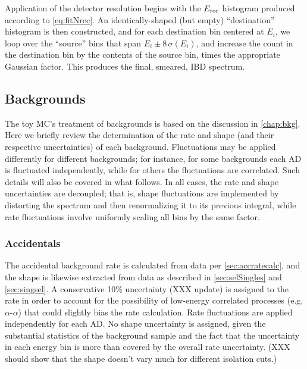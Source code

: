 \documentclass[../thesis.tex]{subfiles}
\begin{document}
Application of the detector resolution begins with the $E_\mathrm{rec}$ histogram produced according to \autoref{eq:fitNrec}. An identically-shaped (but empty) ``destination'' histogram is then constructed, and for each destination bin centered at $E_i$, we loop over the ``source'' bins that span $E_i \pm 8\,\sigma(E_i)$, and increase the count in the destination bin by the contents of the source bin, times the appropriate Gaussian factor. This produces the final, smeared, IBD spectrum.

\subsection{Backgrounds}
\label{sec:fitToyBackgrounds}

The toy MC's treatment of backgrounds is based on the discussion in \autoref{chap:bkg}. Here we briefly review the determination of the rate and shape (and their respective uncertainties) of each background. Fluctuations may be applied differently for different backgrounds; for instance, for some backgrounds each AD is fluctuated independently, while for others the fluctuations are correlated. Such details will also be covered in what follows. In all cases, the rate and shape uncertainties are decoupled; that is, shape fluctuations are implemented by distorting the spectrum and then renormalizing it to its previous integral, while rate fluctuations involve uniformly scaling all bins by the same factor.

\subsubsection{Accidentals}

The accidental background rate is calculated from data per \autoref{sec:accratecalc}, and the shape is likewise extracted from data as described in \autoref{sec:selSingles} and \autoref{sec:singsel}. A conservative 10\% uncertainty (XXX update) is assigned to the rate in order to account for the possibility of low-energy correlated processes (e.g. $\alpha$-$\alpha$) that could slightly bias the rate calculation. Rate fluctuations are applied independently for each AD. No shape uncertainty is assigned, given the substantial statistics of the background sample and the fact that the uncertainty in each energy bin is more than covered by the overall rate uncertainty. (XXX should show that the shape doesn't vary much for different isolation cuts.)

\subsubsection{\LiHe}
\end{document}
